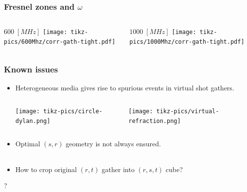 \documentclass{beamer}
\begin{document}
\frame
{
\frametitle{{\bf Fresnel zones and $\omega$}}
\begin{columns}
\begin{column}{0.5\textwidth}
\centering
\small{$600\;[MHz]$}
\texttt{[image: tikz-pics/600Mhz/corr-gath-tight.pdf]}
\end{column}
\begin{column}{0.5\textwidth}
\centering
\small{$1000\;[MHz]$}
\texttt{[image: tikz-pics/1000Mhz/corr-gath-tight.pdf]}
\end{column}
\end{columns}
}
\frame
{
\frametitle{{\bf Known issues}}
\begin{itemize}
\item Heterogeneous media gives rise to spurious events in virtual shot gathers.
\begin{columns}
\begin{column}{0.4\textwidth}
\texttt{[image: tikz-pics/circle-dylan.png]}
\end{column}
\begin{column}{0.4\textwidth}
\texttt{[image: tikz-pics/virtual-refraction.png]}
\end{column}
\end{columns}
\item Optimal $(s,r)$ geometry is not always ensured.
\\~\\
\item How to crop original $(r,t)$ gather into $(r,s,t)$ cube?
\end{itemize}
}
\frame
{
\centering
\Huge{?}
}
\end{document}
